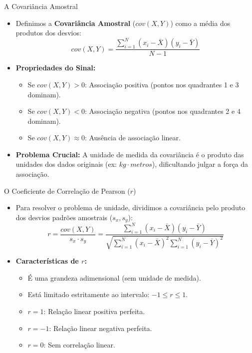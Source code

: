 \begin{frame}{A Covariância Amostral}
    \begin{itemize}
        \item Definimos a \textbf{Covariância Amostral} ($cov(X, Y)$) como a média dos produtos dos desvios:
        $$cov(X, Y) = \frac{\sum_{i=1}^N (x_i - \bar{X})(y_i - \bar{Y})}{N - 1}$$
        \item \textbf{Propriedades do Sinal:}
        \begin{itemize}
            \item Se $cov(X, Y) > 0$: Associação positiva (pontos nos quadrantes 1 e 3 dominam).
            \item Se $cov(X, Y) < 0$: Associação negativa (pontos nos quadrantes 2 e 4 dominam).
            \item Se $cov(X, Y) \approx 0$: Ausência de associação linear.
        \end{itemize}
        \item \textbf{Problema Crucial:} A unidade de medida da covariância é o produto das unidades dos dados originais (ex: $kg \cdot metros$), dificultando julgar a força da associação.
    \end{itemize}
\end{frame}

\begin{frame}{O Coeficiente de Correlação de Pearson ($r$)}
    \begin{itemize}
        \item Para resolver o problema de unidade, dividimos a covariância pelo produto dos desvios padrões amostrais ($s_x, s_y$):
        $$r = \frac{cov(X, Y)}{s_x \cdot s_y} = \frac{\sum_{i=1}^N (x_i - \bar{X})(y_i - \bar{Y})}{\sqrt{\sum_{i=1}^N (x_i - \bar{X})^2 \sum_{i=1}^N (y_i - \bar{Y})^2}}$$
        \item \textbf{Características de $r$:}
        \begin{itemize}
            \item É uma grandeza adimensional (sem unidade de medida).
            \item Está limitado estritamente ao intervalo: $-1 \leq r \leq 1$.
            \item $r = 1$: Relação linear positiva perfeita.
            \item $r = -1$: Relação linear negativa perfeita.
            \item $r = 0$: Sem correlação linear.
        \end{itemize}
    \end{itemize}
\end{frame}

